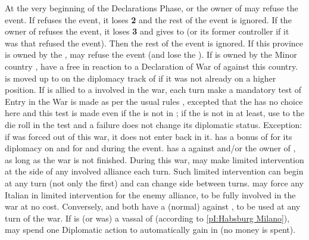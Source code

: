 \phdipl
{}
\bparag At the very beginning of the Declarations Phase, \FRA or the owner of
\provinceLombardia may refuse the event.
\bparag If \FRA refuses the event, it loses {\bf 2} \STAB and the rest of the
event is ignored.
\bparag If the owner of \provinceLombardia refuses the event, it loses {\bf 3}
\STAB and gives \provinceLombardia to \FRA (or its former controller if it was
\FRA that refused the event). Then the rest of the event is ignored. If this
province is owned by the \HAB, \SPA may refuse the event (and lose the \STAB).
 If \provinceLombardia is owned by the Minor
country \paysMilan, \HAB have a free \CB in reaction to a Declaration of War
of \FRA against this country. \paysMilan is moved up to \EG on the diplomacy
track of \HAB if it was not already on a higher position.
 If \payspapaute is allied to a \MAJ involved
in the war, each turn make a mandatory test of Entry in the War is made as per
the usual rules , excepted that the \MAJ has no
choice here and this test is made even if the \MIN is not in \EG; if the
\paysPapaute is not in \EG at least, use  to the die roll in the
test and a failure does not change its diplomatic status. Exception: if
\payspapaute was forced out of this war, it does not enter back in it.
 \FRA has a bonus of  for its
diplomacy on \paysToscane and  for \payspapaute and \paysParme
during the event.
\bparag \VEN has a \CB against \FRA and/or the owner of \provinceLombardia, as
long as the war is not finished.
\bparag During this war, \VEN may make limited intervention at the side of any
involved alliance each turn. Such limited intervention can begin at any turn
(not only the first) and \VEN can change side between turns.  \VEN may force
any Italian \MIN in limited intervention for the enemy alliance, to be fully
involved in the war at no cost.
\bparag Conversely, \FRA and \HAB both have a (normal) \CB against \VEN, to be
used at any turn of the war.
 If \paysMilan is (or was) a vassal of \HAB
(according to \ref{pI:Habsburg Milano}), \HAB may spend one Diplomatic action
to automatically gain \paysSuisse in \CE (no money is spent).

